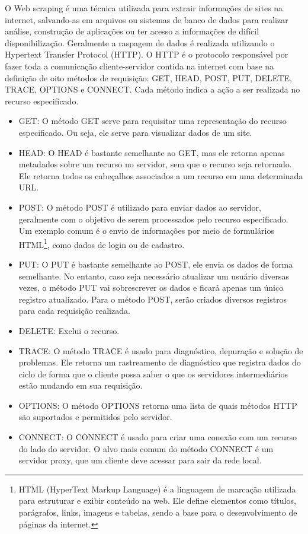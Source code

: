 \documentclass[
  12pt,
  a4paper,
]{scrreprt}
\begin{document}
\vspace{12pt}

O Web scraping é uma técnica utilizada para extrair informações de sites
na internet, salvando-as em arquivos ou sistemas de banco de dados para
realizar análise, construção de aplicações ou ter acesso a informações
de difícil disponibilização. Geralmente a raspagem de dados é realizada
utilizando o Hypertext Transfer Protocol (HTTP). O HTTP é o protocolo
responsável por fazer toda a comunicação cliente-servidor contida na
internet com base na definição de oito métodos de requisição: GET, HEAD,
POST, PUT, DELETE, TRACE, OPTIONS e CONNECT. Cada método indica a ação a
ser realizada no recurso especificado.

\begin{itemize}
\item
  GET: O método GET serve para requisitar uma representação do recurso
  especificado. Ou seja, ele serve para visualizar dados de um site.
\item
  HEAD: O HEAD é bastante semelhante ao GET, mas ele retorna apenas
  metadados sobre um recurso no servidor, sem que o recurso seja
  retornado. Ele retorna todos os cabeçalhos associados a um recurso em
  uma determinada URL.
\item
  POST: O método POST é utilizado para enviar dados ao servidor,
  geralmente com o objetivo de serem processados pelo recurso
  especificado. Um exemplo comum é o envio de informações por meio de
  formulários HTML\footnote{HTML (HyperText Markup Language) é a
    linguagem de marcação utilizada para estruturar e exibir conteúdo na
    web. Ele define elementos como títulos, parágrafos, links, imagens e
    tabelas, sendo a base para o desenvolvimento de páginas da internet.},
  como dados de login ou de cadastro.
\end{itemize}

\begin{itemize}
\item
  PUT: O PUT é bastante semelhante ao POST, ele envia os dados de forma
  semelhante. No entanto, caso seja necessário atualizar um usuário
  diversas vezes, o método PUT vai sobrescrever os dados e ficará apenas
  um único registro atualizado. Para o método POST, serão criados
  diversos registros para cada requisição realizada.
\item
  DELETE: Exclui o recurso.
\item
  TRACE: O método TRACE é usado para diagnóstico, depuração e solução de
  problemas. Ele retorna um rastreamento de diagnóstico que registra
  dados do ciclo de forma que o cliente possa saber o que os servidores
  intermediários estão mudando em sua requisição.
\item
  OPTIONS: O método OPTIONS retorna uma lista de quais métodos HTTP são
  suportados e permitidos pelo servidor.
\item
  CONNECT: O CONNECT é usado para criar uma conexão com um recurso do
  lado do servidor. O alvo mais comum do método CONNECT é um servidor
  proxy, que um cliente deve acessar para sair da rede local.
\end{itemize}
\end{document}
